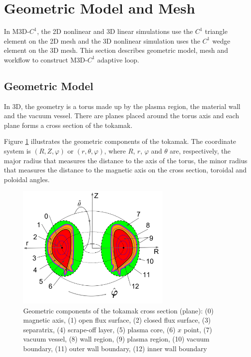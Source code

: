 \documentclass[11pt]{article}  %
\begin{document}
\section{Geometric Model and Mesh} \label{sec:domain}

In M3D-$C^1$, the 2D nonlinear and 3D linear simulations use the $C^1$ triangle element on the 2D mesh and the 3D nonlinear simulation uses the $C^1$ wedge element on the 3D mesh. This section describes geometric model, mesh and workflow to  construct M3D-$C^1$  adaptive loop.

\subsection{Geometric Model}\label{sec:geo}

In 3D, the geometry is a torus made up by the plasma region, the material wall and the vacuum vessel.  There are planes placed around the torus axis and each plane forms a cross section of the tokamak. 

Figure \ref{fig:geo} illustrates the geometric components of the tokamak. The coordinate system is $(R,Z,\varphi)$ or $(r,\theta, \varphi)$, where $R$, $r$, $\varphi$ and $\theta$ are, respectively, the major radius that measures the distance to the axis of the torus, the minor radius that measures the distance to the magnetic axis on the cross section, toroidal and poloidal angles.

\begin{figure}
\center
\includegraphics[width=3in]{fig/fusiongeo3d.png}
\caption{\small{Geometric components of the tokamak cross section (plane): (0) magnetic axis, (1) open flux surface, (2) closed flux surface,  (3) separatrix, (4) scrape-off layer, (5) plasma core, (6) $x$ point, (7) vacuum vessel, (8) wall region, (9) plasma region, (10) vacuum boundary, (11) outer wall boundary, (12) inner wall boundary}}
\label{fig:geo}
\end{figure}
\end{document}
